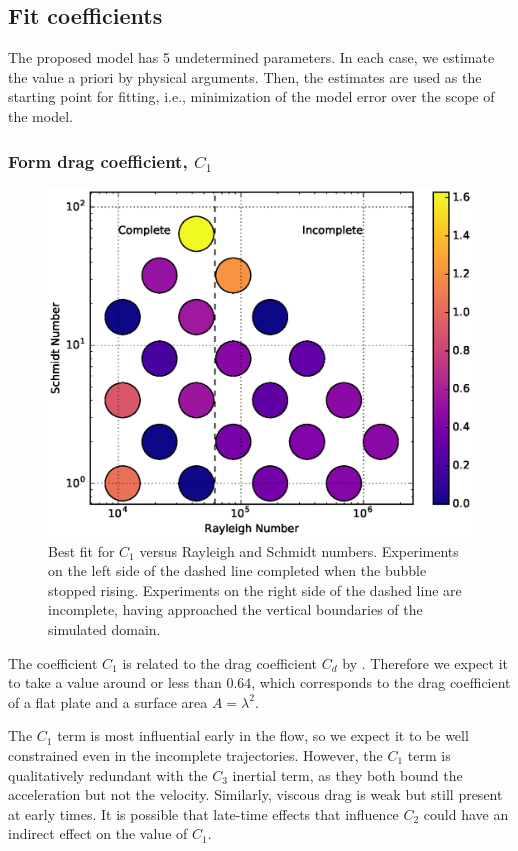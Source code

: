 \subsection{Fit coefficients}
The proposed model has 5 undetermined parameters.
In each case, we estimate the value a priori by physical arguments.
Then, the estimates are used as the starting point for fitting, i.e., minimization of the model error over the scope of the model.

\subsubsection{Form drag coefficient, $C_1$}

\begin{figure}
\includegraphics[width=\columnwidth]{figs/C1-vs-Rayleigh-Schmidt}
\caption{ 
  Best fit for $C_1$ versus Rayleigh and Schmidt numbers.
  Experiments on the left side of the dashed line completed when the bubble stopped rising.
  Experiments on the right side of the dashed line are incomplete, having approached the vertical boundaries of the simulated domain.
}
\end{figure}

The coefficient $C_1$ is related to the drag coefficient $C_d$ by .
Therefore we expect it to take a value around or less than $0.64$, which corresponds to the drag coefficient of a flat plate and a surface area $A = \lambda^2$.

The $C_1$ term is most influential early in the flow, so we expect it to be well constrained even in the incomplete trajectories.
However, the $C_1$ term is qualitatively redundant with the $C_3$ inertial term, as they both bound the acceleration but not the velocity.
Similarly, viscous drag is weak but still present at early times.
It is possible that late-time effects that influence $C_2$ could have an indirect effect on the value of $C_1$.

